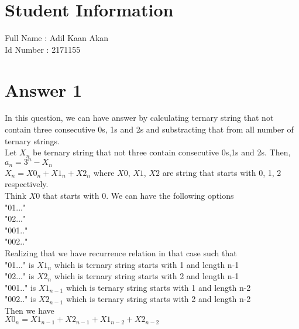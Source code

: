 \documentclass[12pt]{article}
\begin{document}
	
\section*{Student Information } 
Full Name :  Adil Kaan Akan\\
Id Number :  2171155\\

\section*{Answer 1}
In this question, we can have answer by calculating ternary string that not contain three consecutive 0s, 1s and 2s and substracting that from all number of ternary strings. \\
Let $X_n$ be ternary string that not three contain consecutive 0s,1s and 2s. Then, \\
$a_n = 3^n - X_n$ \\
$X_n = {X0}_n+{X1}_n+{X2}_n$ where $X0$, $X1$, $X2$ are string that starts with 0, 1, 2 respectively. \\
Think $X0$ that starts with 0. We can have the following options \\
"01..." \\
"02..." \\
"001.." \\
"002.." \\
Realizing that we have recurrence relation in that case such that \\
"01..." is ${X1}_n$ which is ternary string starts with 1 and length n-1 \\
"02..." is ${X2}_n$ which is ternary string starts with 2 and length n-1 \\
"001.." is ${X1}_{n-1}$ which is ternary string starts with 1 and length n-2 \\
"002.." is ${X2}_{n-1}$ which is ternary string starts with 2 and length n-2 \\
Then we have \\
${X0}_n = {X1}_{n-1} + {X2}_{n-1} +{X1}_{n-2} + {X2}_{n-2} $
\end{document}

